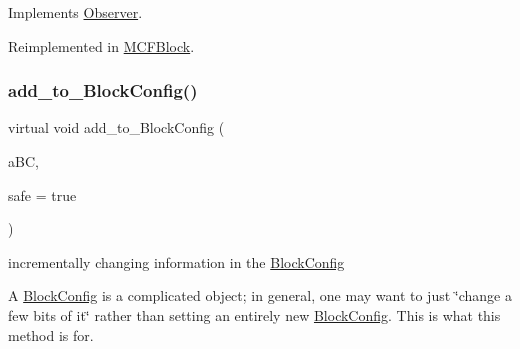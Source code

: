Implements \mbox{\hyperlink{class_s_m_spp__di__unipi__it_1_1_observer_a4ac2234c8026ccbe13860a33fc4ef14e}{Observer}}.



Reimplemented in \mbox{\hyperlink{class_s_m_spp__di__unipi__it_1_1_m_c_f_block_a2d7dffba0c9fd17de24549e0f1a4c760}{M\+C\+F\+Block}}.

\mbox{\label{class_s_m_spp__di__unipi__it_1_1_block_a938909c39570800cc7356eff74b8b7b9}} 
\subsubsection{\texorpdfstring{add\+\_\+to\+\_\+\+Block\+Config()}{add\_to\_BlockConfig()}}
{\footnotesize\ttfamily virtual void add\+\_\+to\+\_\+\+Block\+Config (\begin{DoxyParamCaption}\item[{\mbox{\hyperlink{class_s_m_spp__di__unipi__it_1_1_block_config}{Block\+Config}} $\ast$}]{a\+BC,  }\item[{const bool}]{safe = {\ttfamily true} }\end{DoxyParamCaption})\hspace{0.3cm}{\ttfamily [virtual]}}



incrementally changing information in the \mbox{\hyperlink{class_s_m_spp__di__unipi__it_1_1_block_config}{Block\+Config}} 

A \mbox{\hyperlink{class_s_m_spp__di__unipi__it_1_1_block_config}{Block\+Config}} is a complicated object; in general, one may want to just \char`\"{}change a few bits of it\char`\"{} rather than setting an entirely new \mbox{\hyperlink{class_s_m_spp__di__unipi__it_1_1_block_config}{Block\+Config}}. This is what this method is for.

